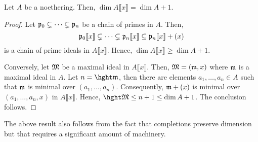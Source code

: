 \begin{theorem}
    Let $A$ be a noethering. Then, $\dim A\llbracket x\rrbracket = \dim A + 1$.
\end{theorem}
\begin{proof}
    Let $\mathfrak p_0\subsetneq\dots\subsetneq\mathfrak p_n$ be a chain of primes in $A$. Then, 
    \begin{equation*}
        \mathfrak p_0\llbracket x\rrbracket\subsetneq\dots\subsetneq\mathfrak p_n\llbracket x\rrbracket\subseteq\mathfrak p_n\llbracket x\rrbracket + (x)
    \end{equation*}
    is a chain of prime ideals in $A\llbracket x\rrbracket$. Hence, $\dim A\llbracket x\rrbracket\ge\dim A + 1$.

    Conversely, let $\mathfrak{M}$ be a maximal ideal in $A\llbracket x\rrbracket$. Then, $\mathfrak{M} = (\mathfrak m, x)$ where $\mathfrak m$ is a maximal ideal in $A$. Let $n = \hght\frakm$, then there are elements $a_1,\dots,a_n\in A$ such that $\mathfrak m$ is minimal over $(a_1,\dots, a_n)$. Consequently, $\mathfrak m + (x)$ is minimal over $(a_1,\dots,a_n, x)$ in $A\llbracket x\rrbracket$. Hence, $\hght\frakM\le n + 1\le\dim A + 1$. The conclusion follows.
\end{proof}

\begin{remark}
    The above result also follows from the fact that completions preserve dimension but that requires a significant amount of machinery.
\end{remark}